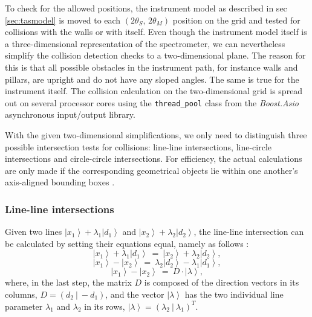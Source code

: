 To check for the allowed positions, the instrument model as described in sec \ref{sec:tasmodel} is moved to
each $\left( 2\theta_S,\, 2\theta_M \right)$ position on the grid and tested for collisions with the walls or with
itself. Even though the instrument model itself is a three-dimensional representation of the spectrometer, we
can nevertheless simplify the collision detection checks to a two-dimensional plane. The reason for this is
that all possible obstacles in the instrument path, for instance walls and pillars, are upright and do not have
any sloped angles. The same is true for the instrument itself.
The collision calculation on the two-dimensional grid is spread out on several processor cores using 
the \lstinline[language=C++]|thread_pool| \cite{web_boost_asio_threadpool} class from the 
\textit{Boost.Asio} \cite{web_boost_asio} asynchronous input/output library.

With the given two-dimensional simplifications, we only need to distinguish three possible intersection tests for collisions: 
line-line intersections, line-circle intersections and circle-circle intersections. 
For efficiency, the actual calculations are only made if the corresponding geometrical objects lie within 
one another's axis-aligned bounding boxes \cite{web_aabb}.

\subsubsection*{Line-line intersections}
Given two lines $\left|x_1\right> + \lambda_1 \left|d_1\right>$ and $\left|x_2\right> + \lambda_2 \left|d_2\right>$, 
the line-line intersection can be calculated by setting their equations equal, namely as follows \cite{wiki_line_line_intersection}:
\begin{equation}
	\left|x_1\right> + \lambda_1 \left|d_1\right> \ =\ \left|x_2\right> + \lambda_2 \left|d_2\right>,
\end{equation}
\begin{equation}
	\left|x_1\right> - \left|x_2\right> \ =\  \lambda_2 \left|d_2\right> - \lambda_1 \left|d_1\right>,
\end{equation}
\begin{equation}
	\left|x_1\right> - \left|x_2\right> \ =\  D \cdot \left| \lambda \right>,
	\label{eq:line_line_inters}
\end{equation}
where, in the last step, the matrix $D$ is composed of the direction vectors in its columns, $D = \left( d_2 \ |\  -d_1 \right)$, 
and the vector $\left| \lambda \right>$ has the two individual line parameter $\lambda_1$ and $\lambda_2$ in its
rows, $\left| \lambda \right> = \left( \lambda_2 \ |\  \lambda_1 \right)^T$.

